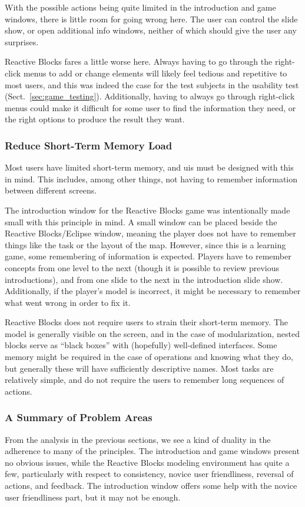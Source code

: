 \noindent
With the possible actions being quite limited in the introduction and game windows, there is little room for going wrong here. The user can control the slide show, or open additional info windows, neither of which should give the user any surprises.

\noindent
Reactive Blocks fares a little worse here. Always having to go through the right-click menus to add or change elements will likely feel tedious and repetitive to most users, and this was indeed the case for the test subjects in the usability test (Sect.~\ref{sec:game_testing}). Additionally, having to always go through right-click menus could make it difficult for some user to find the information they need, or the right options to produce the result they want.

\subsubsection{Reduce Short-Term Memory Load}
Most users have limited short-term memory, and \glspl{ui} must be designed with this in mind. This includes, among other things, not having to remember information between different screens.

\noindent
The introduction window for the Reactive Blocks game was intentionally made small with this principle in mind. A small window can be placed beside the Reactive Blocks/Eclipse window, meaning the player does not have to remember things like the task or the layout of the map. However, since this is a learning game, some remembering of information is expected. Players have to remember concepts from one level to the next (though it is possible to review previous introductions), and from one slide to the next in the introduction slide show. Additionally, if the player's model is incorrect, it might be necessary to remember what went wrong in order to fix it.

\noindent
Reactive Blocks does not require users to strain their short-term memory. The model is generally visible on the screen, and in the case of modularization, nested blocks serve as ``black boxes'' with (hopefully) well-defined interfaces. Some memory might be required in the case of operations and knowing what they do, but generally these will have sufficiently descriptive names. Most tasks are relatively simple, and do not require the users to remember long sequences of actions.

\subsubsection{A Summary of Problem Areas}
From the analysis in the previous sections, we see a kind of duality in the adherence to many of the principles. The introduction and game windows present no obvious issues, while the Reactive Blocks modeling environment has quite a few, particularly with respect to consistency, novice user friendliness, reversal of actions, and feedback. The introduction window offers some help with the novice user friendliness part, but it may not be enough.

